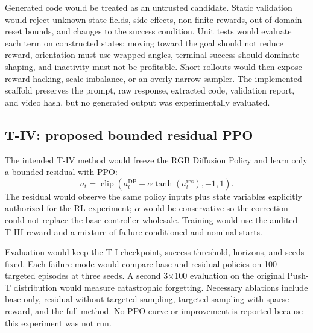 Generated code would be treated as an untrusted candidate. Static validation would reject unknown
state fields, side effects, non-finite rewards, out-of-domain reset bounds, and changes to the
success condition. Unit tests would evaluate each term on constructed states: moving toward the
goal should not reduce reward, orientation must use wrapped angles, terminal success should
dominate shaping, and inactivity must not be profitable. Short rollouts would then expose reward
hacking, scale imbalance, or an overly narrow sampler. The implemented scaffold preserves the
prompt, raw response, extracted code, validation report, and video hash, but no generated output
was experimentally evaluated.

\subsection{T-IV: proposed bounded residual PPO}

The intended T-IV method would freeze the RGB Diffusion Policy and learn only a bounded residual
with PPO:
\begin{equation}
    a_t = \operatorname{clip}\!\left(a_t^{\mathrm{DP}} + \alpha
    \tanh(a_t^{\mathrm{res}}), -1, 1\right).
\end{equation}
The residual would observe the same policy inputs plus state variables explicitly authorized for
the RL experiment; $\alpha$ would be conservative so the correction could not replace the base
controller wholesale. Training would use the audited T-III reward and a mixture of
failure-conditioned and nominal starts.

Evaluation would keep the T-I checkpoint, success threshold, horizons, and seeds fixed. Each
failure mode would compare base and residual policies on 100 targeted episodes at three seeds. A
second 3$\times$100 evaluation on the original Push-T distribution would measure catastrophic
forgetting. Necessary ablations include base only, residual without targeted sampling, targeted
sampling with sparse reward, and the full method. No PPO curve or improvement is reported because
this experiment was not run.
